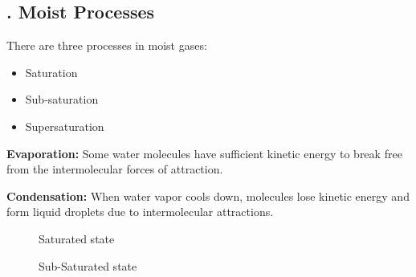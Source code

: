\documentclass[fleqn,10pt]{SelfArx} %
\begin{document}
\subsection{. Moist Processes}
There are three processes in moist gases:
\begin{itemize}[noitemsep]
    \item Saturation
    \item Sub-saturation
    \item Supersaturation
\end{itemize}

\textbf{Evaporation:} Some water molecules have sufficient kinetic energy to break free from the intermolecular forces of attraction.

\textbf{Condensation:} When water vapor cools down, molecules lose kinetic energy and form liquid droplets due to intermolecular attractions.

\begin{figure}[h!]
    \centering
    \caption{Saturated state}
\end{figure}

\begin{figure}[h!]
    \centering
    \caption{Sub-Saturated state}
\end{figure}
\end{document}
